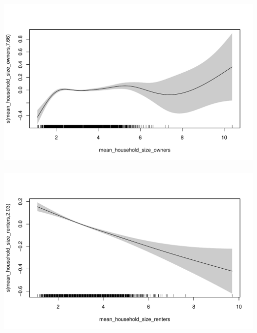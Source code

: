 \documentclass[xetex,mathserif,serif,aspectratio=169]{beamer}
\begin{document}
\begin{frame}[fragile] \frametitle{} \oldB \small

\begin{center}
\includegraphics[width=\textwidth]{img/gamRug08.pdf}
\end{center}

\end{frame}

\begin{frame}[fragile] \frametitle{} \oldB \small

\begin{center}
\includegraphics[width=\textwidth]{img/gamRug09.pdf}
\end{center}

\end{frame}
\end{document}
